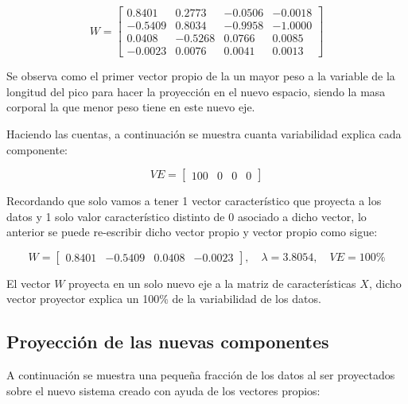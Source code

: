 \documentclass[11pt, letterpaper]{article}
\begin{document}
$$ W = 
\begin{bmatrix}
0.8401 & 0.2773 & -0.0506 & -0.0018 \\
-0.5409 & 0.8034 & -0.9958 & -1.0000 \\
0.0408 & -0.5268 & 0.0766 & 0.0085 \\
-0.0023 & 0.0076 & 0.0041 & 0.0013
\end{bmatrix}
$$

Se observa como el primer vector propio de la un mayor peso a la variable de la longitud del pico para hacer la proyección en el nuevo espacio, siendo la masa corporal la que menor peso tiene en este nuevo eje.

Haciendo las cuentas, a continuación se muestra cuanta variabilidad explica cada componente:

$$VE = 
\begin{bmatrix}
	100 &
	0 &
	0 &
	0 
\end{bmatrix}
$$

Recordando que solo vamos a tener 1 vector característico que proyecta a los datos y 1 solo valor característico distinto de 0 asociado a dicho vector, lo anterior se puede re-escribir dicho vector propio y vector propio como sigue:

$$ W = 
\begin{bmatrix}
	0.8401 & -0.5409 & 0.0408 & -0.0023 
\end{bmatrix}, \quad \lambda = 3.8054, \quad VE = 100\%
$$

El vector $W$ proyecta en un solo nuevo eje a la matriz de características $X$, dicho vector proyector explica un 100\% de la variabilidad de los datos.

 

\newpage

\subsection{Proyección de las nuevas componentes}

A continuación se muestra una pequeña fracción de los datos al ser proyectados sobre el nuevo sistema creado con ayuda de los vectores propios:
\end{document}
